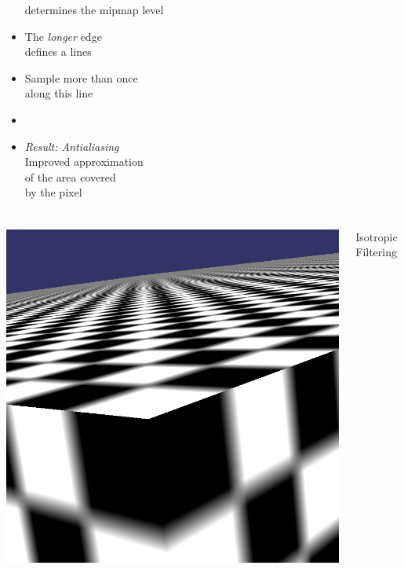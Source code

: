 \documentclass[utf8,stillsansserifmath,fleqn,t]{beamer}
\begin{document}
\begin{frame}[label=texture-mipmap-anisotropic]
\begin{itemize}
determines the mipmap level 
\item<5-> The \emph{longer} edge\\
defines a lines
\item<6-> Sample more than once\\
along this line
\item[~]
\item<6-> \emph{Result: Antialiasing}\\
Improved approximation\\ of the area covered\\ by the pixel
\end{itemize}
\end{frame}

\begin{frame}
\frametitle{\insertsection}
\begin{columns}
\centerline{\includegraphics[width=\textwidth]{./fig/anisotropy-0.png}}
\centerline{Isotropic Filtering}

\end{columns}
\end{frame}
\end{document}
